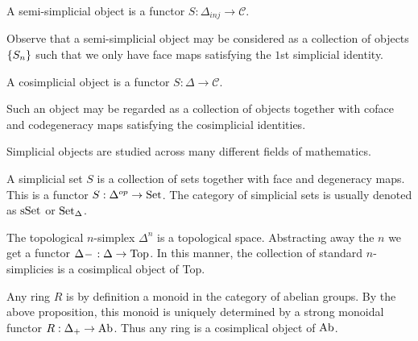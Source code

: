 \documentclass[../thesis.tex]{subfiles}
\begin{document}
        \begin{definition}
            A semi-simplicial object is a functor $S : \Delta_{inj} \rightarrow \mathcal{C}$.
        \end{definition}

        Observe that a semi-simplicial object may be considered as a collection of objects $\startset{S_n}$ such that we only have face maps satisfying the $1$st simplicial identity.
        
        \begin{definition}
            A cosimplicial object is a functor $S:\Delta\rightarrow \mathcal{C}$. 
        \end{definition}
        Such an object may be regarded as a collection of objects together with coface and codegeneracy maps satisfying the cosimplicial identities.
        
        Simplicial objects are studied across many different fields of mathematics.
        \begin{example}
            A simplicial set $S$ is a collection of sets together with face and degeneracy maps. This is a functor $S : \Delta^{op} \rightarrow \tt{Set}$. The category of simplicial sets is usually denoted as $\tt{sSet}$ or $\tt{Set}_\Delta$.

        \end{example}

        \begin{example}
            The topological $n$-simplex $\Delta^n$ is a topological space. Abstracting away the $n$ we get a functor $\Delta^{\argument} : \Delta \rightarrow \tt{Top}$. In this manner, the collection of standard $n$-simplicies is a cosimplical object of Top.
        \end{example}

        \begin{example}[Rings]
            Any ring $R$ is by definition a monoid in the category of abelian groups. By the above proposition, this monoid is uniquely determined by a strong monoidal functor $R : \Delta_+ \rightarrow \tt{Ab}$. Thus any ring is a cosimplical object of $\tt{Ab}$.
        \end{example}
\end{document}
